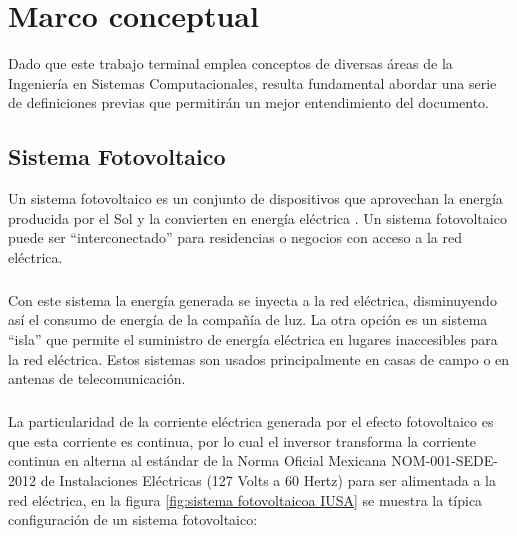 
\chapter{Marco conceptual}\label{chapter2}

Dado que este trabajo terminal emplea conceptos de diversas áreas de la Ingeniería en Sistemas Computacionales, resulta fundamental abordar una serie de definiciones previas que permitirán un mejor entendimiento del documento.


\section{Sistema Fotovoltaico}
Un sistema fotovoltaico es un conjunto de dispositivos que aprovechan la energía producida por el Sol y la convierten en energía eléctrica \citep{MarcoTeorico1}. Un sistema fotovoltaico puede ser “interconectado” para residencias o negocios con acceso a la red eléctrica. 

\paragraph{}
Con este sistema la energía generada se inyecta a la red eléctrica, disminuyendo así el consumo de energía de la compañía de luz. La otra opción es un sistema “isla” que permite el suministro de energía eléctrica en lugares inaccesibles para la red eléctrica. Estos sistemas son usados principalmente en casas de campo o en antenas de telecomunicación.
\paragraph{}
La particularidad de la corriente eléctrica generada por el efecto fotovoltaico es que esta corriente es continua, por lo cual el inversor transforma la corriente continua en alterna al estándar de la Norma Oficial Mexicana NOM-001-SEDE-2012 de Instalaciones Eléctricas (127 Volts a 60 Hertz) \citep{NORMA-Electrica} para ser alimentada a la red eléctrica, en la figura \ref{fig:sistema fotovoltaicoa IUSA} se muestra la típica configuración de un sistema fotovoltaico:

